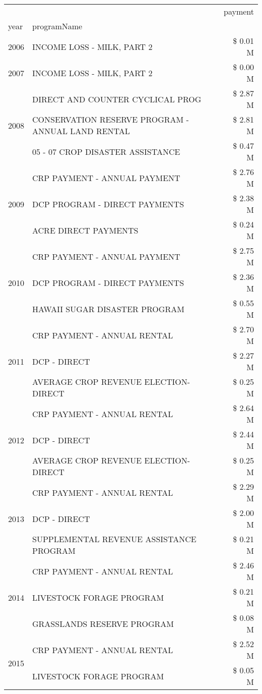 \begin{tabular}{llr}
\toprule
 &  & payment \\
year & programName &  \\
\midrule
2006 & INCOME LOSS - MILK, PART 2 & \$ 0.01 M \\
\cline{1-3}
2007 & INCOME LOSS - MILK, PART 2 & \$ 0.00 M \\
\cline{1-3}
\multirow[t]{3}{*}{2008} & DIRECT AND COUNTER CYCLICAL PROG & \$ 2.87 M \\
 & CONSERVATION RESERVE PROGRAM - ANNUAL LAND RENTAL & \$ 2.81 M \\
 & 05 - 07 CROP DISASTER ASSISTANCE & \$ 0.47 M \\
\cline{1-3}
\multirow[t]{3}{*}{2009} & CRP PAYMENT - ANNUAL PAYMENT & \$ 2.76 M \\
 & DCP PROGRAM - DIRECT PAYMENTS & \$ 2.38 M \\
 & ACRE DIRECT PAYMENTS & \$ 0.24 M \\
\cline{1-3}
\multirow[t]{3}{*}{2010} & CRP PAYMENT - ANNUAL PAYMENT & \$ 2.75 M \\
 & DCP PROGRAM - DIRECT PAYMENTS & \$ 2.36 M \\
 & HAWAII SUGAR DISASTER PROGRAM & \$ 0.55 M \\
\cline{1-3}
\multirow[t]{3}{*}{2011} & CRP PAYMENT - ANNUAL RENTAL & \$ 2.70 M \\
 & DCP - DIRECT & \$ 2.27 M \\
 & AVERAGE CROP REVENUE ELECTION-DIRECT & \$ 0.25 M \\
\cline{1-3}
\multirow[t]{3}{*}{2012} & CRP PAYMENT - ANNUAL RENTAL & \$ 2.64 M \\
 & DCP - DIRECT & \$ 2.44 M \\
 & AVERAGE CROP REVENUE ELECTION-DIRECT & \$ 0.25 M \\
\cline{1-3}
\multirow[t]{3}{*}{2013} & CRP PAYMENT - ANNUAL RENTAL & \$ 2.29 M \\
 & DCP - DIRECT & \$ 2.00 M \\
 & SUPPLEMENTAL REVENUE ASSISTANCE PROGRAM & \$ 0.21 M \\
\cline{1-3}
\multirow[t]{3}{*}{2014} & CRP PAYMENT - ANNUAL RENTAL & \$ 2.46 M \\
 & LIVESTOCK FORAGE PROGRAM & \$ 0.21 M \\
 & GRASSLANDS RESERVE PROGRAM & \$ 0.08 M \\
\cline{1-3}
\multirow[t]{3}{*}{2015} & CRP PAYMENT - ANNUAL RENTAL & \$ 2.52 M \\
 & LIVESTOCK FORAGE PROGRAM & \$ 0.05 M \\

\end{tabular}

